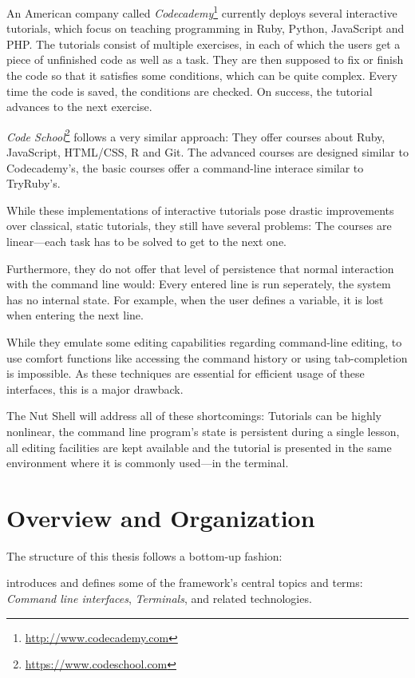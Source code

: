 \documentclass[paper=a4,twoside,abstract=on,cleardoublepage=empty,numbers=noenddot,toc=bib,12pt,appendixprefix=true]{scrreprt}
\begin{document}

An American company called \emph{Codecademy}\footnote{\url{http://www.codecademy.com}} currently deploys several interactive tutorials, which focus on teaching programming in Ruby, Python, JavaScript and PHP. The tutorials consist of multiple exercises, in each of which the users get a piece of unfinished code as well as a task. They are then supposed to fix or finish the code so that it satisfies some conditions, which can be quite complex. Every time the code is saved, the conditions are checked. On success, the tutorial advances to the next exercise.

\emph{Code School}\footnote{\url{https://www.codeschool.com}} follows a very similar approach: They offer courses about Ruby, JavaScript, HTML/CSS, R and Git. The advanced courses are designed similar to Codecademy's, the basic courses offer a command-line interace similar to TryRuby's.

While these implementations of interactive tutorials pose drastic improvements over classical, static tutorials, they still have several problems: The courses are linear---each task has to be solved to get to the next one.

Furthermore, they do not offer that level of persistence that normal interaction with the command line would: Every entered line is run seperately, the system has no internal state. For example, when the user defines a variable, it is lost when entering the next line.

While they emulate some editing capabilities regarding command-line editing, to use comfort functions like accessing the command history or using tab-completion is impossible. As these techniques are essential for efficient usage of these interfaces, this is a major drawback.

The Nut Shell will address all of these shortcomings: Tutorials can be highly nonlinear, the command line program's state is persistent during a single lesson, all editing facilities are kept available and the tutorial is presented in the same environment where it is commonly used---in the terminal.

\section{Overview and Organization}

The structure of this thesis follows a bottom-up fashion:

 introduces and defines some of the framework's central topics and terms: \emph{Command line interfaces}, \emph{Terminals}, and related technologies.
\end{document}
